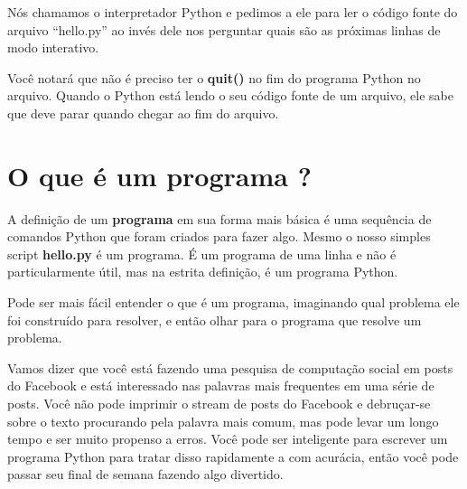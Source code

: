 Nós chamamos o interpretador Python e pedimos a ele para ler o código fonte do
arquivo ``hello.py'' ao invés dele nos perguntar quais são as próximas linhas
de modo interativo.
%

Você notará que não é preciso ter o {\bf quit()} no fim do programa Python
no arquivo. Quando o Python está lendo o seu código fonte de um arquivo,
ele sabe que deve parar quando chegar ao fim do arquivo.
%

\section{O que é um programa ?}
%

A definição de um {\bf programa} em sua forma mais básica é uma sequência
de comandos Python que foram criados para fazer algo.
Mesmo o nosso simples script {\bf hello.py} é um programa. É um programa
de uma linha e não é particularmente útil, mas na estrita definição, é
um programa Python.
%

Pode ser mais fácil entender o que é um programa, imaginando qual problema ele
foi construído para resolver, e então olhar para o programa que resolve um
problema.
%

Vamos dizer que você está fazendo uma pesquisa de computação social em posts
do Facebook e está interessado nas palavras mais frequentes em uma série de posts.
Você não pode imprimir o stream de posts do Facebook e debruçar-se sobre o texto
procurando pela palavra mais comum, mas pode levar um longo tempo e ser muito
propenso a erros. Você pode ser inteligente para escrever um programa Python para
tratar disso rapidamente a com acurácia, então você pode passar seu final de semana
fazendo algo divertido.
%

